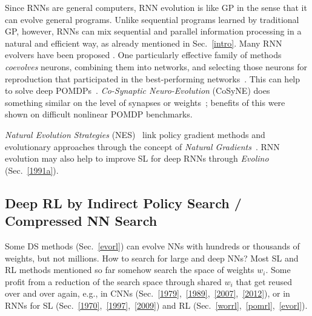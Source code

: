 \documentclass[letterpaper]{article}
\begin{document}
\begin{sloppypar}
Since RNNs are general computers, 
RNN evolution is like GP in the sense that it can evolve general programs.
Unlike sequential programs learned by traditional GP, however, RNNs can mix sequential and parallel information processing in a natural and efficient way, as already 
mentioned in Sec.~\ref{intro}. Many RNN evolvers have been proposed \citep[e.g.,][]{miller:icga89,wieland1991,cliff1993,yao:review93,nolfi:alife4,Sims:1994:EVC,yamauchi94sequential,miglino95evolving,moriarty:phd,pasemann99,juang2004,whiteson2012}.
One particularly effective  family of methods {\em coevolves} neurons, combining them into networks, and
selecting those neurons for reproduction that participated in the best-performing
networks~\citep{moriarty:ml96,gomez:phd,Gomez:03}. This
can help to solve deep POMDPs~\citep{Gomez:05gecco}.
{\em Co-Synaptic Neuro-Evolution} (CoSyNE) does something similar on the level of synapses or weights~\citep{Gomez:08jmlr};
benefits of this were shown on difficult nonlinear POMDP benchmarks.

{\em Natural Evolution Strategies} (NES)~\citep{wierstraCEC08,glasmachers:2010b,Sun2009a,sun:gecco13} link policy
gradient methods and evolutionary approaches through the concept of {\em Natural Gradients}~\citep{amari1998natural}.
RNN evolution may also help to improve SL for deep RNNs 
through {\em Evolino}~\citep{Schmidhuber:07nc} (Sec.~\ref{1991a}).


\subsection{Deep RL by Indirect Policy Search / Compressed NN Search}
\label{comrl}

Some DS methods (Sec.~\ref{evorl}) can evolve NNs  
with hundreds or thousands of weights, but not millions. 
How to search for large and deep NNs? 
Most SL and RL methods mentioned so far somehow search the space of weights $w_i$. 
Some profit from a reduction of the search space through shared $w_i$ 
that get reused over and over again, e.g., in CNNs (Sec.~\ref{1979},~\ref{1989},~\ref{2007},~\ref{2012}),
or in RNNs for SL (Sec.~\ref{1970},~\ref{1997},~\ref{2009}) and RL (Sec.~\ref{worrl},~\ref{pomrl},~\ref{evorl}).


\end{sloppypar}
\end{document}
